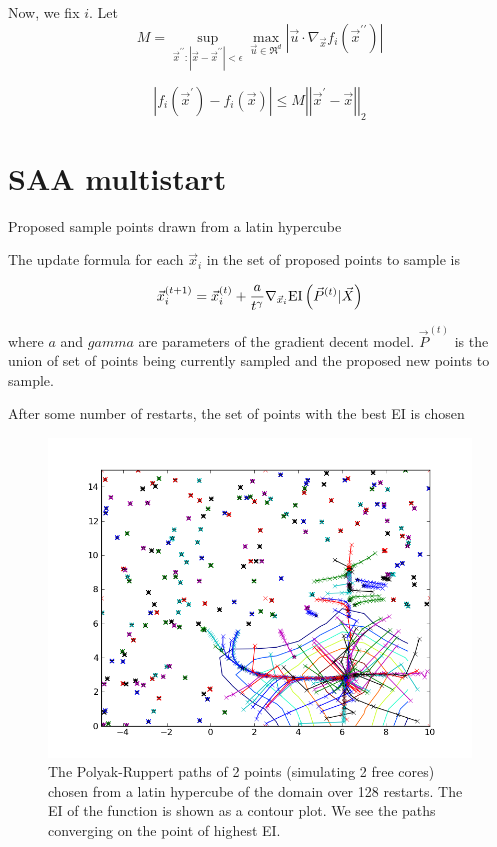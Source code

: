 \documentclass[phd,tocprelim]{cornell}
\begin{document}
Now, we fix $i$. Let
\begin{equation}
    M = \sup_{\vec{x}^{\prime\prime}:|\vec{x} - \vec{x}^{\prime\prime}| < \epsilon} \max_{\vec{u} \in \Re^{d}} \left|\vec{u} \cdot \nabla_{\vec{x}} f_{i}(\vec{x}^{\prime\prime}) \right|
\end{equation}

\begin{equation}
    \left|f_{i}(\vec{x}^{\prime}) - f_{i}(\vec{x})\right| \leq M \left| \left| \vec{x}^{\prime} - \vec{x}\right|\right|_{2}
\end{equation}

\section{SAA multistart}

Proposed sample points drawn from a latin hypercube

The update formula for each $\vec{x}_{i}$ in the set of proposed points to sample is

\begin{equation}
    \vec{x}_{i}^{(t+1)} = \vec{x}_{i}^{(t)} + \frac{a}{t^{\gamma}} \nabla_{\vec{x}_{i}} {\rm EI}\left(\vec{P}^{(t)} | \vec{X}\right)
\end{equation}

where $a$ and $gamma$ are parameters of the gradient decent model. $\vec{P}^{(t)}$ is the union of set of points being currently sampled and the proposed new points to sample.

After some number of restarts, the set of points with the best EI is chosen

\begin{figure}[hpt]
 	\centerline{\includegraphics[width=\textwidth]{figures/EPI/branin_2d_32pk_paths_and_EI.png}}
    \caption[Polyak-Ruppert paths in Branin Function]{The Polyak-Ruppert paths of 2 points (simulating 2 free cores) chosen from a latin hypercube of the domain over 128 restarts. The EI of the function is shown as a contour plot. We see the paths converging on the point of highest EI.}
 	\label{fig:pk_paths}
 \end{figure}
\end{document}
